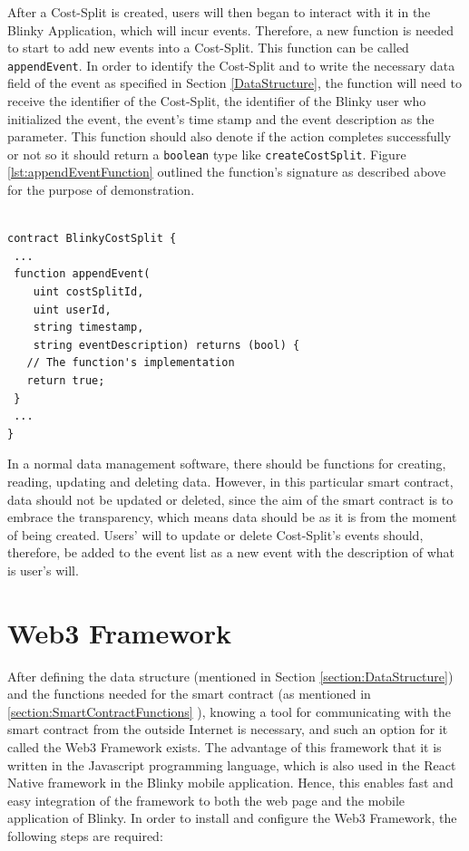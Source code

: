\documentclass[twoside,numperchapter]{tutthesis} %
\begin{document}
After a Cost-Split is created, users will then began to interact with it in the Blinky Application, which will incur events. Therefore, a new function is needed to start to add new events into a Cost-Split. This function can be called \texttt{appendEvent}. In order to identify the Cost-Split and to write the necessary data field of the event as specified in Section \ref{DataStructure}, the function will need to receive the identifier of the Cost-Split, the identifier of the Blinky user who initialized the event, the event's time stamp and the event description as the parameter. This function should also denote if the action completes successfully or not so it should return a \texttt{boolean} type like \texttt{createCostSplit}. Figure \ref{lst:appendEventFunction} outlined the function's signature as described above for the purpose of demonstration.

\begin{lstlisting}[float,caption={Skeleton implementation of function \texttt{appendEvent}.},label={lst:appendEventFunction},language=Solidity]

contract BlinkyCostSplit {
 ...
 function appendEvent(
    uint costSplitId,
    uint userId,
    string timestamp,
    string eventDescription) returns (bool) {
   // The function's implementation
   return true;
 }
 ...
}

\end{lstlisting}

In a normal data management software, there should be functions for creating, reading, updating and deleting data. However, in this particular smart contract, data should not be updated or deleted, since the aim of the smart contract is to embrace the transparency, which means data should be as it is from the moment of being created. Users' will to update or delete Cost-Split's events should, therefore, be added to the event list as a new event with the description of what is user's will.

\section{Web3 Framework}

After defining the data structure (mentioned in Section \ref{section:DataStructure}) and the functions needed for the smart contract (as mentioned in \ref{section:SmartContractFunctions} ), knowing a tool for communicating with the smart contract from the outside Internet is necessary, and such an option for it called the Web3 Framework exists. The advantage of this framework that it is written in the Javascript programming language, which is also used in the React Native framework in the Blinky mobile application. Hence, this enables fast and easy integration of the framework to both the web page and the mobile application of Blinky. In order to install and configure the Web3 Framework, the following steps are required:
\end{document}
